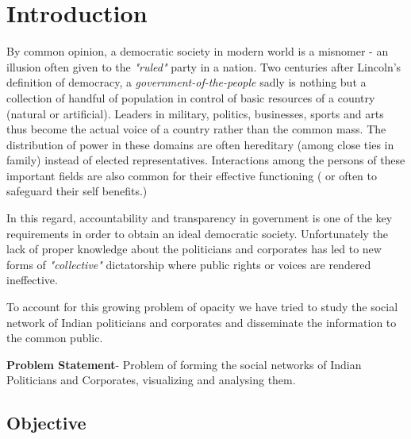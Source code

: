 \chapter{Introduction}


By common opinion, a democratic society in modern world is a misnomer - an illusion often given to the \emph{ "ruled" } party in a nation. Two centuries after Lincoln's definition of democracy, a \emph{ government-of-the-people  }sadly is nothing but a collection of handful of population in control of basic resources of a country (natural or artificial). Leaders in military, politics, businesses, sports and arts thus become the actual voice of a country rather than the common mass. The distribution of power in these domains are often hereditary (among close ties in family) instead of elected representatives. Interactions among the persons of these important fields are also common for their effective functioning ( or often to safeguard their self benefits.)

In this regard, accountability and transparency in government is one of the key requirements in order to obtain an ideal democratic society. Unfortunately the lack of proper knowledge about the politicians and corporates has led to new forms of \emph{ "collective" } dictatorship where public rights or voices are rendered ineffective.

To account for this growing problem of opacity we have tried to study the social network of Indian politicians and corporates and disseminate the information to the common public.

\textbf{Problem Statement}-
Problem of forming the social networks of Indian Politicians and Corporates, visualizing  and analysing them.

\section{Objective}

